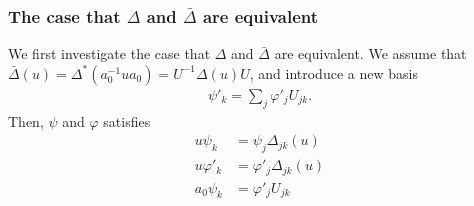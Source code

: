 \documentclass{article}
\begin{document}
\subsubsection{The case that $\Delta$ and $\bar{\Delta}$ are equivalent}
We first investigate the case that $\Delta$ and $\bar{\Delta}$ are equivalent.
We assume that $\bar{\Delta}(u) = \Delta^*(a_0^{-1} u a_0) = U^{-1} \Delta(u) U$, and introduce a new basis
\begin{align}
  \psi'_k = \sum_j \varphi'_j U_{jk}.
\end{align}
Then, $\psi$ and $\varphi$ satisfies
\begin{align}
  u \psi_k &= \psi_j \Delta_{jk} (u)
  \nonumber
  \\
  u \varphi'_k &= \varphi'_j \Delta_{jk}(u)
  \nonumber
  \\
  a_0 \psi_k &= \varphi'_j U_{jk}
\end{align}









\end{document}
